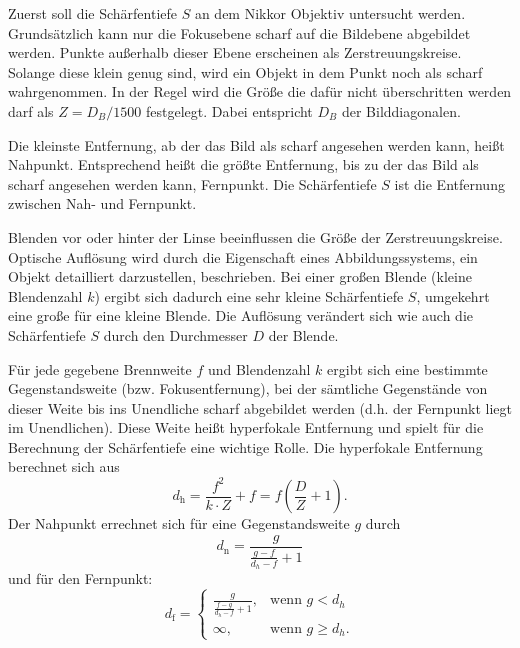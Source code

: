 		Zuerst soll die Schärfentiefe $S$ an dem Nikkor Objektiv untersucht werden. 	
		Grundsätzlich kann nur die Fokusebene scharf auf die Bildebene abgebildet werden. 
		Punkte außerhalb dieser Ebene erscheinen als Zerstreuungskreise. 
		Solange diese klein genug sind, wird ein Objekt in dem Punkt noch als scharf wahrgenommen.
		In der Regel wird die Größe die dafür nicht überschritten werden darf als $Z = D_B/1500$ festgelegt.
		Dabei entspricht $D_B$ der Bilddiagonalen.
		
		Die kleinste Entfernung, ab der das Bild als scharf angesehen werden kann, heißt Nahpunkt. Entsprechend heißt die größte Entfernung, bis zu der das Bild als scharf angesehen werden kann, Fernpunkt. Die Schärfentiefe $S$ ist die Entfernung zwischen Nah- und Fernpunkt.
		
		Blenden vor oder hinter der Linse beeinflussen die Größe der Zerstreuungskreise. 
		Optische Auflösung wird durch die Eigenschaft eines Abbildungssystems, ein Objekt detailliert darzustellen, beschrieben. 
		Bei einer großen Blende (kleine Blendenzahl $k$) ergibt sich dadurch eine sehr kleine Schärfentiefe $S$, umgekehrt eine große für eine kleine Blende. 
		Die Auflösung verändert sich wie auch die Schärfentiefe $S$ durch den Durchmesser $D$ der Blende.
		
		Für jede gegebene Brennweite $f$ und Blendenzahl $k$ ergibt sich eine bestimmte Gegenstandsweite (bzw. Fokusentfernung), bei der sämtliche Gegenstände von dieser Weite bis ins Unendliche scharf abgebildet werden (d.h. der Fernpunkt liegt im Unendlichen). Diese Weite heißt hyperfokale Entfernung und spielt für die Berechnung der Schärfentiefe eine wichtige Rolle.
		Die hyperfokale Entfernung berechnet sich aus
		\begin{equation} \label{eq:hyperfokal}
			d_\text{h} = \frac{f^2}{k\cdot Z} + f = f \left( \frac{D}{Z}+1\right) .
		\end{equation}
		Der Nahpunkt errechnet sich für eine Gegenstandsweite $g$ durch
		\begin{equation} \label{eq:nah}
			d_\text{n} = \frac{g}{\frac{g-f}{d_h-f}+1}
		\end{equation} 
		und für den Fernpunkt:
		\begin{equation} \label{eq:fern}
			d_\text{f} = 
			\begin{cases}
				\frac{g}{\frac{f-g}{d_h-f}+1}, & \text{wenn } g < d_h \\
				\infty, & \text{wenn } g \geq d_h .
			\end{cases}
		\end{equation}
		
